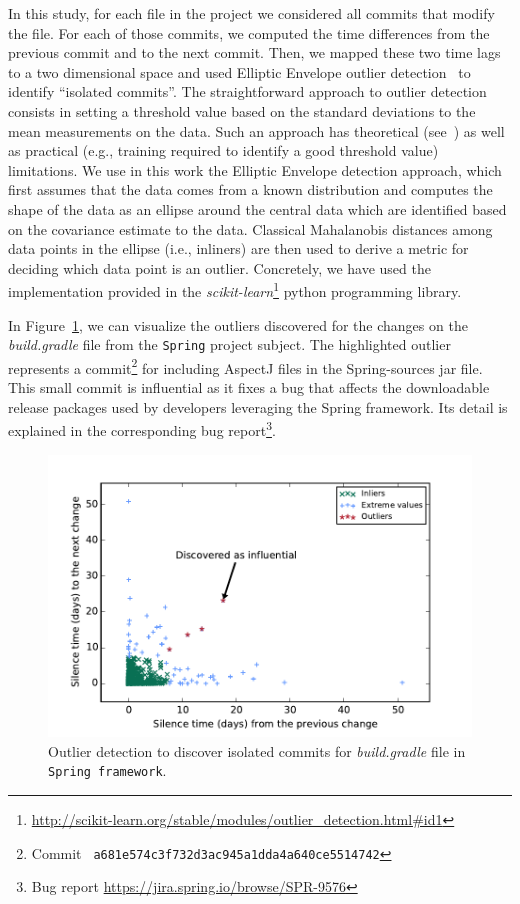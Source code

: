 In this study, for each file in the project we considered all commits that
modify the file. For each of those commits, we computed the time differences
from the previous commit and to the next commit. Then, we mapped these two time
lags to a two dimensional space and used Elliptic Envelope outlier detection~\cite{rousseeuw1999fast} to
identify ``isolated commits''. The straightforward approach to outlier detection consists
in setting a threshold value based on the standard deviations to the mean measurements on the data. Such
an approach has theoretical (see~\cite{LEYS2013764}) as well as practical (e.g., training required to identify a good threshold value) limitations. We use in this work the Elliptic Envelope detection approach, which first assumes that the data comes from a known distribution and computes the shape of the data as an ellipse around the central data which are 
identified based on the covariance estimate to the data. Classical Mahalanobis distances among data points in
the ellipse (i.e., inliners) are then used to derive a metric for deciding which data point is an outlier. 
Concretely, we have used the implementation provided in the {\em scikit-learn}\footnote{\url{http://scikit-learn.org/stable/modules/outlier\_detection.html\#id1}} python programming library.

In Figure~\ref{fig:build-gradle}, we can visualize the outliers discovered for
the changes on the {\em build.gradle} file from the {\tt Spring} project
subject. The highlighted outlier represents a commit\footnote{Commit \tt\small
a681e574c3f732d3ac945a1dda4a640ce5514742} for including AspectJ files in the
Spring-sources jar file. This small commit is influential as it
fixes a bug that affects the downloadable release packages used by developers
leveraging the Spring framework. Its detail is explained in the corresponding bug report\footnote{Bug report \url{https://jira.spring.io/browse/SPR-9576}}.


\begin{figure}[t!]
\centering
\includegraphics[width=0.8\linewidth]{fig/build-gradle.pdf}
\caption{Outlier detection to discover isolated commits for {\em build.gradle} file in {\tt Spring framework}.}
\label{fig:build-gradle}
\end{figure}



